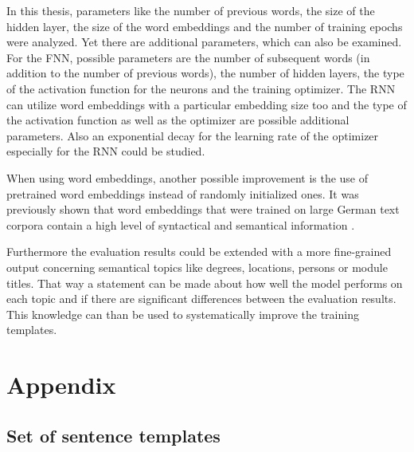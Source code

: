 In this thesis, parameters like the number of previous words, the size of the hidden layer, the size of the word embeddings and the number of training epochs were analyzed. Yet there are additional parameters, which can also be examined. For the FNN, possible parameters are the number of subsequent words (in addition to the number of previous words), the number of hidden layers, the type of the activation function for the neurons and the training optimizer. The RNN can utilize word embeddings with a particular embedding size too and the type of the activation function as well as the optimizer are possible additional parameters. Also an exponential decay for the learning rate of the optimizer especially for the RNN could be studied.

When using word embeddings, another possible improvement is the use of pretrained word embeddings instead of randomly initialized ones. It was previously shown that word embeddings that were trained on large German text corpora contain a high level of syntactical and semantical information \cite{mueller2015}.

Furthermore the evaluation results could be extended with a more fine-grained output concerning semantical topics like degrees, locations, persons or module titles. That way a statement can be made about how well the model performs on each topic and if there are significant differences between the evaluation results. This knowledge can than be used to systematically improve the training templates.




\appendix
\chapter{Appendix}\label{c.appendix}

\section{Set of sentence templates}\label{c.appendix.sentencetemplates}


